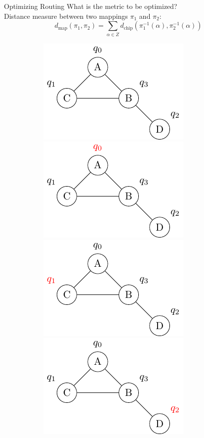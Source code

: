 \documentclass{beamer}
\begin{document}
\begin{frame}{Optimizing Routing}\pause
What is the metric to be optimized? \pause \\
Distance measure between two mappings $\pi_1$ and $\pi_2$:
 $$ d_{\text{map}}(\pi_1, \pi_2) =  \sum_{\alpha \in Z} d_{\text{chip}}(\pi_1^{-1}(\alpha), \pi_2^{-1}(\alpha)) $$ \pause
\begin{figure}
     \centering
     \vspace{-0.2cm}
     \begin{subfigure}[b]{0.45\textwidth}
		\begin{overprint}
		\centering
		\includegraphics[scale=0.6]{figures/pi_1_1}
		\onslide<6>\centering
		\includegraphics[scale=0.6]{figures/pi_1_2}
		\onslide<7>\centering
		\includegraphics[scale=0.6]{figures/pi_1_3}
		\onslide<8>\centering
		\includegraphics[scale=0.6]{figures/pi_1_4}

\end{overprint}
\end{subfigure}
\end{figure}
\end{frame}
\end{document}
